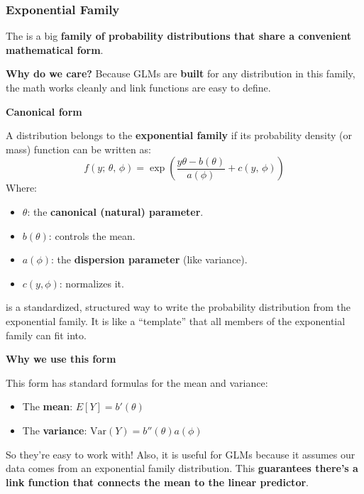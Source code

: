 \subsubsection{Exponential Family}

The  is a big \textbf{family of probability distributions that share a convenient mathematical form}.

\highspace
\textcolor{Green3}{ \textbf{Why do we care?}} Because GLMs are \textbf{built} for any distribution in this family, the math works cleanly and link functions are easy to define.

\highspace
\begin{flushleft}
    \textcolor{Green3}{ \textbf{Canonical form}}
\end{flushleft}
A distribution belongs to the \textbf{exponential family} if its probability density (or mass) function can be written as:
\begin{equation}
    f(y; \, \theta, \, \phi) = \exp \left( \dfrac{y \theta - b(\theta)}{a(\phi)} + c(y, \, \phi) \right)
\end{equation}
Where:
\begin{itemize}
    \item $\theta$: the \textbf{canonical (natural) parameter}.
    \item $b(\theta)$: controls the mean.
    \item $a(\phi)$: the \textbf{dispersion parameter} (like variance).
    \item $c(y, \phi)$: normalizes it.
\end{itemize}
 is a standardized, structured way to write the probability distribution from the exponential family. It is like a ``template'' that all members of the exponential family can fit into.

\highspace
\begin{flushleft}
    \textcolor{Green3}{ \textbf{Why we use this form}}
\end{flushleft}
This form has standard formulas for the mean and variance:
\begin{itemize}
    \item The \textbf{mean}: $E[Y] = b'\left(\theta\right)$
    \item The \textbf{variance}: $\text{Var}\left(Y\right) = b''\left(\theta\right) a\left(\phi\right)$
\end{itemize}
So they're easy to work with! Also, it is useful for GLMs because it assumes our data comes from an exponential family distribution. This \textbf{guarantees there's a link function that connects the mean to the linear predictor}.

